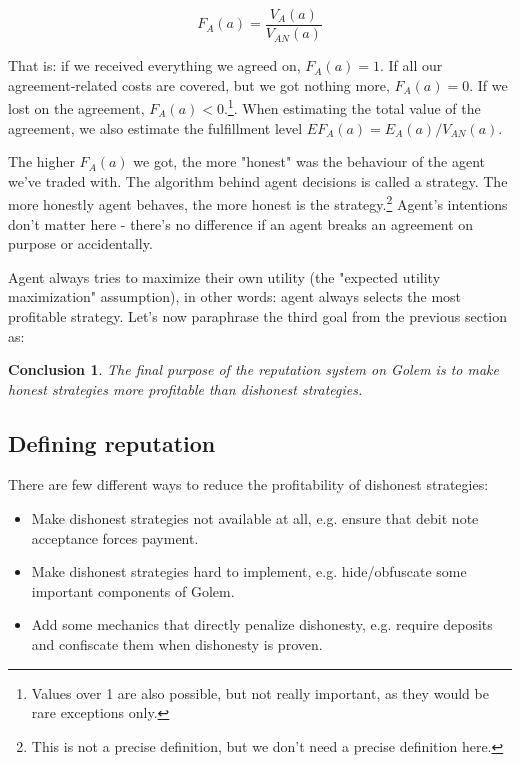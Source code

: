 \documentclass{article}
\newtheorem{conclusion}{Conclusion}[section]
\begin{document}
\begin{equation}
    F_A(a) = \frac{V_A(a)}{V_{AN}(a)}
\end{equation}

That is: if we received everything we agreed on, $F_A(a) = 1$. If all our agreement-related costs are covered, but we got nothing more, $F_A(a) = 0$.
If we lost on the agreement, $F_A(a) < 0$.\footnote{Values over 1 are also possible, but not really important, as they would be rare exceptions only.}.
When estimating the total value of the agreement, we also estimate the fulfillment level $EF_A(a) = E_A(a) / V_{AN}(a)$.

The higher $F_A(a)$ we got, the more "honest" was the behaviour of the agent we've traded with.
The algorithm behind agent decisions is called a strategy. The more honestly agent behaves, the more honest is the strategy.\footnote{
This is not a precise definition, but we don't need a precise definition here.}
Agent's intentions don't matter here - there's no difference if an agent breaks an agreement on purpose or accidentally.

Agent always tries to maximize their own utility (the "expected utility maximization" assumption), in other words: agent always selects the most profitable strategy.
Let's now paraphrase the third goal from the previous section as:

\begin{conclusion}

The final purpose of the reputation system on Golem is to make honest strategies more profitable than dishonest strategies.

\label{main purpose conclusion}
\end{conclusion}


\subsection{Defining reputation}

There are few different ways to reduce the profitability of dishonest strategies:

\begin{itemize}
\item{Make dishonest strategies not available at all, e.g. ensure that debit note acceptance forces payment.}
\item{Make dishonest strategies hard to implement, e.g. hide/obfuscate some important components of Golem.}
\item{Add some mechanics that directly penalize dishonesty, e.g. require deposits and confiscate them when dishonesty is proven.}
\end{itemize}
\end{document}

